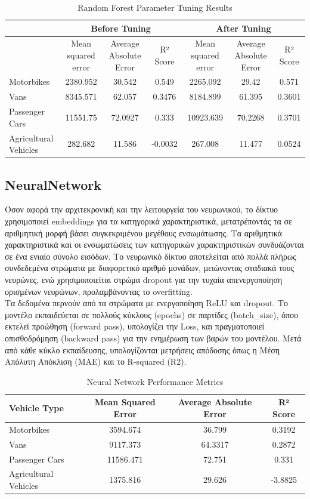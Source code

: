 \documentclass{llncs}
\begin{document}
\begin{table}[h!]
    \centering
    \begin{tabular}{lccc|ccc}
        \hline
        & \multicolumn{3}{c}{Before Tuning} & \multicolumn{3}{c}{After Tuning} \\
        \hline
        & Mean squared error & Average Absolute Error & R² Score & Mean squared error & Average Absolute Error & R² Score \\
        \hline
        Motorbikes & 2380.952 & 30.542 & 0.549 & 2265.092 & 29.42 & 0.571 \\
        Vans & 8345.571 & 62.057 & 0.3476 & 8184.899 & 61.395 & 0.3601 \\
        Passenger Cars & 11551.75 & 72.0927 & 0.333 & 10923.639 & 70.2268 & 0.3701 \\
        Agricultural Vehicles & 282.682 & 11.586 & -0.0032 & 267.008 & 11.477 & 0.0524 \\
        \hline
    \end{tabular}
    \caption{Random Forest Parameter Tuning Results}
\end{table}

\subsection{NeuralNetwork}

Όσον αφορά την αρχιτεκρονική και την λειτουργεία του νευρωνικού,
το δίκτυο χρησιμοποιεί embeddings για τα κατηγορικά χαρακτηριστικά, μετατρέποντάς τα σε αριθμητική μορφή βάσει συγκεκριμένου μεγέθους ενσωμάτωσης.
Τα αριθμητικά χαρακτηριστικά και οι ενσωματώσεις των κατηγορικών χαρακτηριστικών συνδυάζονται σε ένα ενιαίο σύνολο εισόδων. Το νευρωνικό δίκτυο αποτελείται από πολλά πλήρως συνδεδεμένα στρώματα 
με διαφορετικό αριθμό μονάδων, μειώνοντας σταδιακά τους νευρώνες, ενώ χρησιμοποιείται στρώμα dropout για την τυχαία απενεργοποίηση ορισμένων νευρώνων, προλαμβάνοντας το overfitting.\\
Τα δεδομένα περνούν από τα στρώματα με ενεργοποίηση ReLU και dropout. Το μοντέλο εκπαιδεύεται σε πολλούς κύκλους (epochs) σε παρτίδες (batch\_size), όπου εκτελεί προώθηση (forward pass), υπολογίζει την Loss, 
και πραγματοποιεί οπισθοδρόμηση (backward pass) για την ενημέρωση των βαρών του μοντέλου. Μετά από κάθε κύκλο εκπαίδευσης, υπολογίζονται μετρήσεις απόδοσης όπως η Μέση Απόλυτη Απόκλιση (MAE) και το R-squared (R2).

\begin{table}[h!]
    \centering
    \begin{tabular}{|l|c|c|c|}
        \hline
        Vehicle Type & Mean Squared Error & Average Absolute Error & R² Score \\
        \hline
        Motorbikes & 3594.674 & 36.799 & 0.3192 \\
        Vans & 9117.373 & 64.3317 & 0.2872 \\
        Passenger Cars & 11586.471 & 72.751 & 0.331 \\
        Agricultural Vehicles & 1375.816 & 29.626 & -3.8825 \\
        \hline
    \end{tabular}
    \caption{Neural Network Performance Metrics}
\end{table}
\end{document}
